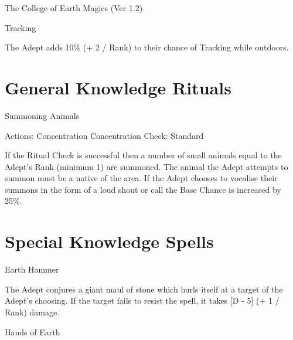 \begin{Chapter}{The College of Earth Magics (Ver 1.2)}
\begin{spell}[G-11]{Tracking}

\begin{effects}
The Adept adds 10\% (+ 2 / Rank) to their chance of Tracking while outdoors.
\end{effects}
\end{spell}

\section{General Knowledge Rituals}

\begin{ritual}[Q-1]{Summoning Animals}

Actions: Concentration 
Concentration Check: Standard 
\begin{effects}
If the Ritual Check is successful then a number of small animals equal
to the Adept’s Rank (minimum 1) are summoned. The animal the Adept
attempts to summon must be a native of the area. If the Adept chooses
to vocalise their summons in the form of a loud shout or call the Base
Chance is increased by 25\%.
\end{effects}
\end{ritual}

\section{Special Knowledge Spells}

\begin{spell}[S-1]{Earth Hammer}

\begin{effects}
The Adept conjures a giant maul of stone which hurls itself at a
target of the Adept’s choosing. If the target fails to resist the
spell, it takes [D - 5] (+ 1 / Rank) damage.
\end{effects}
\end{spell}

\begin{spell}[S-2]{Hands of Earth}


\end{spell}
\end{Chapter}
